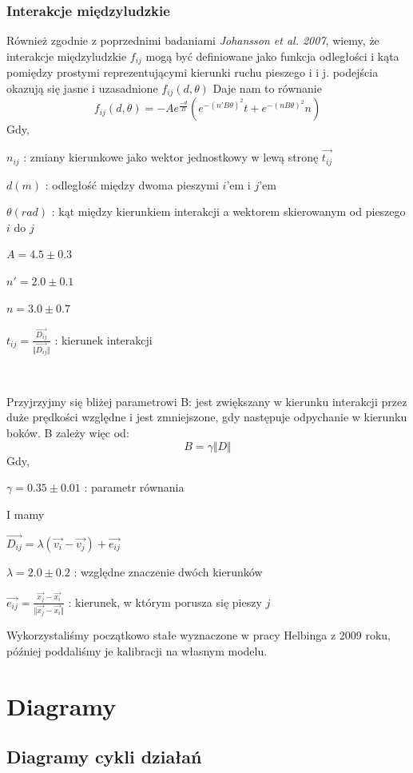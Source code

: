 \subsubsection{Interakcje międzyludzkie}
\hspace{4ex}Również zgodnie z poprzednimi badaniami {\it Johansson et al. 2007}, wiemy, że interakcje międzyludzkie $f_{ij}$ mogą być definiowane jako funkcja odległości i kąta pomiędzy prostymi reprezentującymi kierunki ruchu pieszego i i j. podejścia okazują się jasne i uzasadnione $f_{ij}(d,\theta)$ Daje nam to równanie
$$
f_{ij}(d,\theta) = -Ae^{\frac{-d}{B}}(e^{-(n'B\theta)^2}t + e^{-(nB\theta)^2}n)
$$
Gdy,\\
\centerline{$n_{ij}$ : zmiany kierunkowe jako wektor jednostkowy w lewą stronę $\vec{t_{ij}}$}
\centerline{$d(m)$ : odległość między dwoma pieszymi $i$'em i $j$'em}
\centerline{$\theta(rad)$ : kąt między kierunkiem interakcji a wektorem skierowanym od pieszego $i$ do $j$}
\centerline{$A = 4.5 \pm 0.3$}
\centerline{$n' = 2.0 \pm 0.1$}
\centerline{$n = 3.0 \pm 0.7$}
\centerline{$t_{ij} = \frac{\vec{D_{ij}}}{\Vert \vec{D_{ij}} \Vert}$ : kierunek interakcji}\\
\par
Przyjrzyjmy się bliżej parametrowi B: jest zwiększany w kierunku interakcji przez duże prędkości względne i jest zmniejszone, gdy następuje odpychanie w kierunku boków. B zależy więc od:
$$
B = \gamma \Vert D \Vert
$$
Gdy,\\
\centerline{$\gamma = 0.35 \pm 0.01$ : parametr równania}
I mamy \\ \centerline{$\vec{D_{ij}} = \lambda(\vec{v_i} - \vec{v_j}) + \vec{e_{ij}}$}
\centerline{$\lambda = 2.0 \pm 0.2$ : względne znaczenie dwóch kierunków}
\centerline{$\vec{e_{ij}} = \frac{\vec{x_j}-\vec{x_i}}{\Vert \vec{x_j} - \vec{x_i} \Vert}$ : kierunek, w którym porusza się pieszy $j$}

Wykorzystaliśmy początkowo stałe wyznaczone w pracy Helbinga z 2009 roku, później poddaliśmy je kalibracji na własnym modelu.

\section{Diagramy}
\subsection{Diagramy cykli działań}
